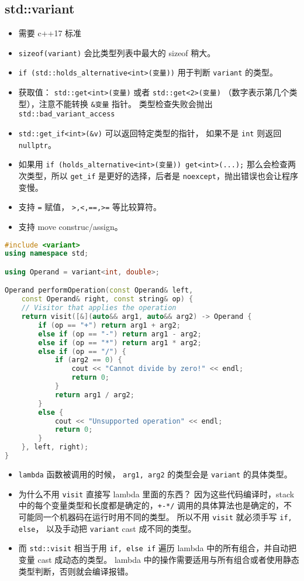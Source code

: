 \subsection{std::variant}
\begin{itemize}
\item 需要 c++17 标准
\item \verb|sizeof(variant)| 会比类型列表中最大的 sizeof 稍大。
\item \verb|if (std::holds_alternative<int>(变量))| 用于判断 \verb|variant| 的类型。
\item 获取值： \verb|std::get<int>(变量)| 或者 \verb|std::get<2>(变量)| （数字表示第几个类型），注意不能转换 \verb|&变量| 指针。 类型检查失败会抛出 \verb|std::bad_variant_access|
\item \verb|std::get_if<int>(&v)| 可以返回特定类型的指针， 如果不是 \verb|int| 则返回 \verb|nullptr|。
\item 如果用 \verb|if (holds_alternative<int>(变量)) get<int>(...);| 那么会检查两次类型，所以 \verb|get_if| 是更好的选择，后者是 \verb|noexcept|，抛出错误也会让程序变慢。
\item 支持 \verb|=| 赋值， \verb|>,<,==,>=| 等比较算符。
\item 支持 move construc/assign。
\end{itemize}
\begin{lstlisting}[language=cpp]
#include <variant>
using namespace std;

using Operand = variant<int, double>;

Operand performOperation(const Operand& left,
    const Operand& right, const string& op) {
    // Visitor that applies the operation
    return visit([&](auto&& arg1, auto&& arg2) -> Operand {
        if (op == "+") return arg1 + arg2;
        else if (op == "-") return arg1 - arg2;
        else if (op == "*") return arg1 * arg2;
        else if (op == "/") {
            if (arg2 == 0) {
                cout << "Cannot divide by zero!" << endl;
                return 0;
            }
            return arg1 / arg2;
        }
        else {
            cout << "Unsupported operation" << endl;
            return 0;
        }
    }, left, right);
}
\end{lstlisting}
\begin{itemize}
\item \verb|lambda| 函数被调用的时候， \verb|arg1, arg2| 的类型会是 \verb|variant| 的具体类型。
\item 为什么不用 \verb`visit` 直接写 lambda 里面的东西？ 因为这些代码编译时，stack 中的每个变量类型和长度都是确定的，\verb|+-*/| 调用的具体算法也是确定的，不可能同一个机器码在运行时用不同的类型。 所以不用 \verb|visit| 就必须手写 \verb|if, else|， 以及手动把 \verb|variant| cast 成不同的类型。
\item 而 \verb|std::visit| 相当于用 \verb|if, else if| 遍历 lambda 中的所有组合，并自动把变量 cast 成动态的类型。 lambda 中的操作需要适用与所有组合或者使用静态类型判断，否则就会编译报错。
\end{itemize}

